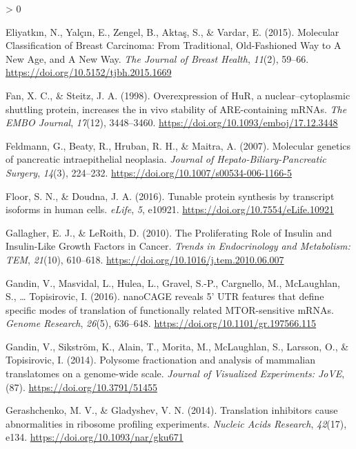 \documentclass[
  12pt,
  openany]{book}
\newlength{\cslhangindent}
\newenvironment{CSLReferences}[2] %
 {%
  \setlength{\parindent}{0pt}
  \ifodd #1 \everypar{\setlength{\hangindent}{\cslhangindent}}\ignorespaces\fi
  \ifnum #2 > 0
  \setlength{\parskip}{#2\baselineskip}
  \fi
 }%
 {}
\begin{document}
\begin{CSLReferences}{1}{0}
\leavevmode\hypertarget{ref-Eliyatkin2015}{}%
Eliyatkın, N., Yalçın, E., Zengel, B., Aktaş, S., \& Vardar, E. (2015). Molecular {Classification} of {Breast Carcinoma}: {From Traditional}, {Old}-{Fashioned Way} to {A New Age}, and {A New Way}. \emph{The Journal of Breast Health}, \emph{11}(2), 59--66. \url{https://doi.org/10.5152/tjbh.2015.1669}

\leavevmode\hypertarget{ref-Fan1998}{}%
Fan, X. C., \& Steitz, J. A. (1998). Overexpression of {HuR}, a nuclear--cytoplasmic shuttling protein, increases the in vivo stability of {ARE}-containing {mRNAs}. \emph{The EMBO Journal}, \emph{17}(12), 3448--3460. \url{https://doi.org/10.1093/emboj/17.12.3448}

\leavevmode\hypertarget{ref-Feldmann2007}{}%
Feldmann, G., Beaty, R., Hruban, R. H., \& Maitra, A. (2007). Molecular genetics of pancreatic intraepithelial neoplasia. \emph{Journal of Hepato-Biliary-Pancreatic Surgery}, \emph{14}(3), 224--232. \url{https://doi.org/10.1007/s00534-006-1166-5}

\leavevmode\hypertarget{ref-Floor2016}{}%
Floor, S. N., \& Doudna, J. A. (2016). Tunable protein synthesis by transcript isoforms in human cells. \emph{eLife}, \emph{5}, e10921. \url{https://doi.org/10.7554/eLife.10921}

\leavevmode\hypertarget{ref-Gallagher2010}{}%
Gallagher, E. J., \& LeRoith, D. (2010). The {Proliferating Role} of {Insulin} and {Insulin}-{Like Growth Factors} in {Cancer}. \emph{Trends in Endocrinology and Metabolism: TEM}, \emph{21}(10), 610--618. \url{https://doi.org/10.1016/j.tem.2010.06.007}

\leavevmode\hypertarget{ref-Gandin2016a}{}%
Gandin, V., Masvidal, L., Hulea, L., Gravel, S.-P., Cargnello, M., McLaughlan, S., \ldots{} Topisirovic, I. (2016). {nanoCAGE} reveals 5' {UTR} features that define specific modes of translation of functionally related {MTOR}-sensitive {mRNAs}. \emph{Genome Research}, \emph{26}(5), 636--648. \url{https://doi.org/10.1101/gr.197566.115}

\leavevmode\hypertarget{ref-Gandin2014}{}%
Gandin, V., Sikström, K., Alain, T., Morita, M., McLaughlan, S., Larsson, O., \& Topisirovic, I. (2014). Polysome fractionation and analysis of mammalian translatomes on a genome-wide scale. \emph{Journal of Visualized Experiments: JoVE}, (87). \url{https://doi.org/10.3791/51455}

\leavevmode\hypertarget{ref-Gerashchenko2014}{}%
Gerashchenko, M. V., \& Gladyshev, V. N. (2014). Translation inhibitors cause abnormalities in ribosome profiling experiments. \emph{Nucleic Acids Research}, \emph{42}(17), e134. \url{https://doi.org/10.1093/nar/gku671}


\end{CSLReferences}
\end{document}
